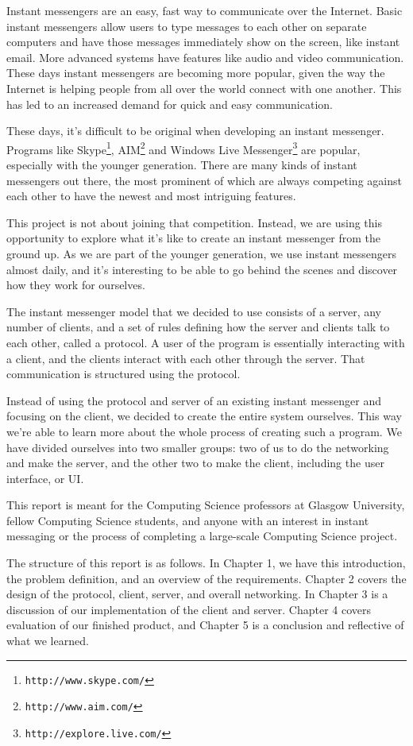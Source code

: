 Instant messengers are an easy, fast way to communicate over the Internet. Basic instant messengers allow users to type messages to each other on separate computers and have those messages immediately show on the screen, like instant email. More advanced systems have features like audio and video communication. These days instant messengers are becoming more popular, given the way the Internet is helping people from all over the world connect with one another. This has led to an increased demand for quick and easy communication.

These days, it's difficult to be original when developing an instant messenger. Programs like Skype\footnote{\texttt{http://www.skype.com/}}, AIM\footnote{\texttt{http://www.aim.com/}} and Windows Live Messenger\footnote{\texttt{http://explore.live.com/}} are popular, especially with the younger generation. There are many kinds of instant messengers out there, the most prominent of which are always competing against each other to have the newest and most intriguing features.

This project is not about joining that competition. Instead, we are using this opportunity to explore what it's like to create an instant messenger from the ground up. As we are part of the younger generation, we use instant messengers almost daily, and it's interesting to be able to go behind the scenes and discover how they work for ourselves.

The instant messenger model that we decided to use consists of a server, any number of clients, and a set of rules defining how the server and clients talk to each other, called a protocol. A user of the program is essentially interacting with a client, and the clients interact with each other through the server. That communication is structured using the protocol.

Instead of using the protocol and server of an existing instant messenger and focusing on the client, we decided to create the entire system ourselves. This way we're able to learn more about the whole process of creating such a program. We have divided ourselves into two smaller groups: two of us to do the networking and make the server, and the other two to make the client, including the user interface, or UI.

This report is meant for the Computing Science professors at Glasgow University, fellow Computing Science students, and anyone with an interest in instant messaging or the process of completing a large-scale Computing Science project.

The structure of this report is as follows. In Chapter 1, we have this introduction, the problem definition, and an overview of the requirements. Chapter 2 covers the design of the protocol, client, server, and overall networking. In Chapter 3 is a discussion of our implementation of the client and server. Chapter 4 covers evaluation of our finished product, and Chapter 5 is a conclusion and reflective of what we learned.
